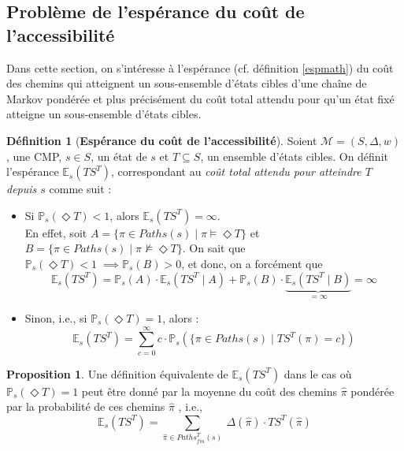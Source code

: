\documentclass[12pt,a4paper]{report}
\theoremstyle{definition}%
\newtheorem{definition}{Définition}[chapter]
\newtheorem{proposition}{Proposition}[chapter]
\theoremstyle{remark}
\newcommand{\ie}{i.e., }
\newcommand{\cf}{cf. }
\newcommand{\pr}{\mathbb{P}}
\let\labelitemi\labelitemii
\begin{document}
\subsection{Problème de l'espérance du coût de l'accessibilité} \label{pb-esp-cout-acc}
Dans cette section, on s'intéresse à l'espérance (\cf définition \ref{espmath}) du coût des chemins qui atteignent un sous-ensemble d'états cibles d'une chaîne de Markov pondérée et plus précisément du coût total attendu pour qu'un état fixé atteigne un sous-ensemble d'états cibles.

\begin{definition}[\textbf{Espérance du coût de l'accessibilité}] \label{esp-access}
	Soient $\mathcal{M} = (S, \Delta, w)$, une CMP, $s \in S$, un état de $s$ et $T \subseteq S$, un ensemble d'états cibles. On définit l'espérance $\mathbb{E}_s(TS^T)$, correspondant au \textit{coût total attendu pour atteindre $T$ depuis $s$} comme suit :
	\begin{itemize}
	\renewcommand{\labelitemi}{\tiny$\bullet$}
	\item Si $\pr_s(\Diamond T) < 1$, alors $\mathbb{E}_s(TS^T) = \infty$.%
		\\ En effet, soit $A = \{ \pi \in Paths(s) \; | \; \pi \models \Diamond T  \}$ et $B = \{ \pi \in Paths(s) \; | \; \pi \not \models \Diamond T  \}$. On sait que $\pr_s(\Diamond T) < 1 \; \implies \pr_s(B) > 0$, et donc, on a forcément que
		\[
			\mathbb{E}_s (TS^T) = \pr_s(A) \cdot \mathbb{E}_s(TS^T \; | \; A) + \pr_s(B) \cdot \underbrace{\mathbb{E}_s(TS^T \; | \; B)}_{ = \infty } = \infty
		\]
	\item Sinon, \ie si $\pr_s(\Diamond T) = 1$, alors :
	\[ \mathbb{E}_s(TS^T) = \sum_{c = 0}^\infty c \cdot \pr_s(\{\pi \in Paths(s) \; | \; TS^T(\pi) = c \})\]
	\end{itemize}
\end{definition}

\begin{proposition}
			Une définition équivalente de $\mathbb{E}_s(TS^T)$ dans le cas où $\pr_s(\Diamond T) = 1$ peut être donné par la moyenne du coût des chemins $\hat{\pi}$ pondérée par la probabilité de ces chemins $\hat{\pi}$ %
	, \ie
	\[\mathbb{E}_s(TS^T) = \sum_{\hat{\pi} \in Paths_{fin}^T(s)}\ \Delta(\hat{\pi}) \cdot TS^T(\hat{\pi})\]
\end{proposition}
\end{document}
